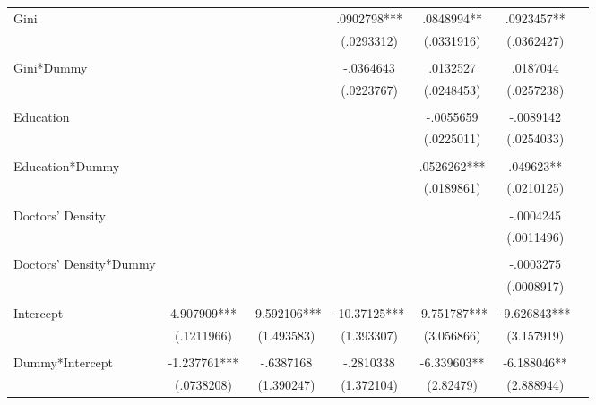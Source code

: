 \documentclass[a4paper]{article}
\theoremstyle{plain}
\theoremstyle{definition}
\begin{document}
\begin{table}
{\begin{tabular}{l*{6}{c}}
                \\
Gini            &               &               &    .0902798***&    .0848994** &    .0923457** \\
                &               &               &  (.0293312)   &  (.0331916)   &  (.0362427)   \\
  \\
Gini*Dummy  &               &               &   -.0364643   &    .0132527   &    .0187044   \\
                &               &               &  (.0223767)   &  (.0248453)   &  (.0257238)   \\
                \\
Education            &               &               &               &   -.0055659   &   -.0089142   \\
                &               &               &               &  (.0225011)   &  (.0254033)   \\
  \\
Education*Dummy  &               &               &               &    .0526262***&     .049623** \\
                &               &               &               &  (.0189861)   &  (.0210125)   \\
                \\
Doctors' Density &               &               &               &               &   -.0004245   \\
                &               &               &               &               &  (.0011496)   \\
 \\
Doctors' Density*Dummy &               &               &               &               &   -.0003275   \\
                &               &               &               &               &  (.0008917)   \\
                \\
Intercept          &    4.907909***&   -9.592106***&   -10.37125***&   -9.751787***&   -9.626843***\\
                &  (.1211966)   &  (1.493583)   &  (1.393307)   &  (3.056866)   &  (3.157919)   \\
\\
Dummy*Intercept         &   -1.237761***&   -.6387168   &   -.2810338   &   -6.339603** &   -6.188046** \\
                &  (.0738208)   &  (1.390247)   &  (1.372104)   &   (2.82479)   &  (2.888944)   \\

\end{tabular}}
\end{table}
\end{document}
